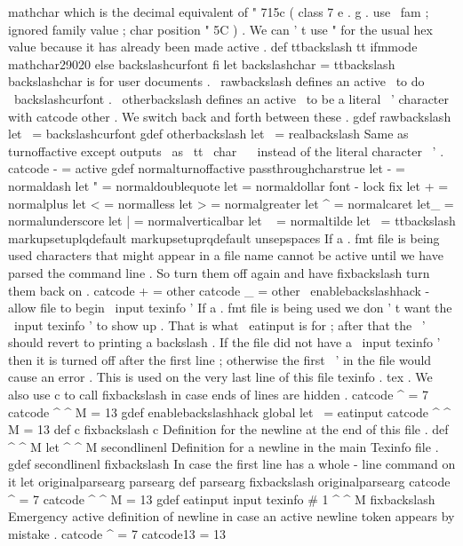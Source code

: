 {{{{mathchar
%
which
is
the
decimal
equivalent
of
"
715c
(
class
7
e
.
g
.
use
\
fam
;
%
ignored
family
value
;
char
position
"
5C
)
.
We
can
'
t
use
"
for
the
%
usual
hex
value
because
it
has
already
been
made
active
.
def
ttbackslash
{
{
tt
ifmmode
mathchar29020
else
backslashcurfont
fi
}
}
let
backslashchar
=
ttbackslash
%
backslashchar
{
}
is
for
user
documents
.
%
\
rawbackslash
defines
an
active
\
to
do
\
backslashcurfont
.
%
\
otherbackslash
defines
an
active
\
to
be
a
literal
\
'
character
with
%
catcode
other
.
We
switch
back
and
forth
between
these
.
gdef
rawbackslash
{
let
\
=
backslashcurfont
}
gdef
otherbackslash
{
let
\
=
realbackslash
}
%
Same
as
turnoffactive
except
outputs
\
as
{
\
tt
\
char
\
\
}
instead
of
%
the
literal
character
\
'
.
%
{
catcode
-
=
active
gdef
normalturnoffactive
{
%
passthroughcharstrue
let
-
=
normaldash
let
"
=
normaldoublequote
let
=
normaldollar
%
font
-
lock
fix
let
+
=
normalplus
let
<
=
normalless
let
>
=
normalgreater
let
^
=
normalcaret
let_
=
normalunderscore
let
|
=
normalverticalbar
let
~
=
normaltilde
let
\
=
ttbackslash
markupsetuplqdefault
markupsetuprqdefault
unsepspaces
}
}
%
If
a
.
fmt
file
is
being
used
characters
that
might
appear
in
a
file
%
name
cannot
be
active
until
we
have
parsed
the
command
line
.
%
So
turn
them
off
again
and
have
fixbackslash
turn
them
back
on
.
catcode
+
=
other
catcode
_
=
other
%
\
enablebackslashhack
-
allow
file
to
begin
\
input
texinfo
'
%
%
If
a
.
fmt
file
is
being
used
we
don
'
t
want
the
\
input
texinfo
'
to
show
up
.
%
That
is
what
\
eatinput
is
for
;
after
that
the
\
'
should
revert
to
printing
%
a
backslash
.
%
If
the
file
did
not
have
a
\
input
texinfo
'
then
it
is
turned
off
after
%
the
first
line
;
otherwise
the
first
\
'
in
the
file
would
cause
an
error
.
%
This
is
used
on
the
very
last
line
of
this
file
texinfo
.
tex
.
%
We
also
use
c
to
call
fixbackslash
in
case
ends
of
lines
are
hidden
.
{
catcode
^
=
7
catcode
^
^
M
=
13
gdef
enablebackslashhack
{
%
global
let
\
=
eatinput
%
catcode
^
^
M
=
13
%
def
c
{
fixbackslash
c
}
%
%
Definition
for
the
newline
at
the
end
of
this
file
.
def
^
^
M
{
let
^
^
M
secondlinenl
}
%
%
Definition
for
a
newline
in
the
main
Texinfo
file
.
gdef
secondlinenl
{
fixbackslash
}
%
%
In
case
the
first
line
has
a
whole
-
line
command
on
it
let
originalparsearg
parsearg
def
parsearg
{
fixbackslash
originalparsearg
}
}
}
{
catcode
^
=
7
catcode
^
^
M
=
13
%
gdef
eatinput
input
texinfo
#
1
^
^
M
{
fixbackslash
}
}
%
Emergency
active
definition
of
newline
in
case
an
active
newline
token
%
appears
by
mistake
.
{
catcode
^
=
7
catcode13
=
13
}}}}}

